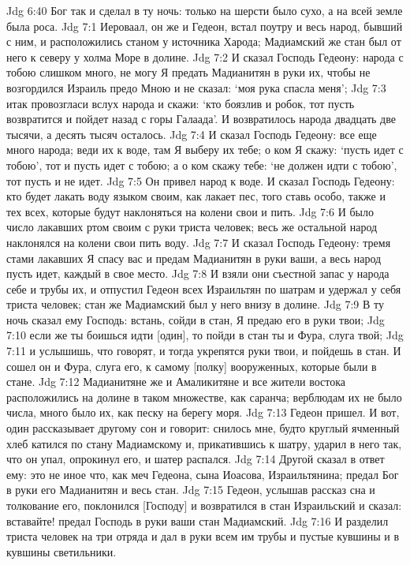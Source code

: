 Jdg 6:40  Бог так и сделал в ту ночь: только на шерсти было сухо, а на всей земле была роса.
Jdg 7:1  Иероваал, он же и Гедеон, встал поутру и весь народ, бывший с ним, и расположились станом у источника Харода; Мадиамский же стан был от него к северу у холма Море в долине.
Jdg 7:2  И сказал Господь Гедеону: народа с тобою слишком много, не могу Я предать Мадианитян в руки их, чтобы не возгордился Израиль предо Мною и не сказал: `моя рука спасла меня';
Jdg 7:3  итак провозгласи вслух народа и скажи: `кто боязлив и робок, тот пусть возвратится и пойдет назад с горы Галаада'. И возвратилось народа двадцать две тысячи, а десять тысяч осталось.
Jdg 7:4  И сказал Господь Гедеону: все еще много народа; веди их к воде, там Я выберу их тебе; о ком Я скажу: `пусть идет с тобою', тот и пусть идет с тобою; а о ком скажу тебе: `не должен идти с тобою', тот пусть и не идет.
Jdg 7:5  Он привел народ к воде. И сказал Господь Гедеону: кто будет лакать воду языком своим, как лакает пес, того ставь особо, также и тех всех, которые будут наклоняться на колени свои и пить.
Jdg 7:6  И было число лакавших ртом своим с руки триста человек; весь же остальной народ наклонялся на колени свои пить воду.
Jdg 7:7  И сказал Господь Гедеону: тремя стами лакавших Я спасу вас и предам Мадианитян в руки ваши, а весь народ пусть идет, каждый в свое место.
Jdg 7:8  И взяли они съестной запас у народа себе и трубы их, и отпустил Гедеон всех Израильтян по шатрам и удержал у себя триста человек; стан же Мадиамский был у него внизу в долине.
Jdg 7:9  В ту ночь сказал ему Господь: встань, сойди в стан, Я предаю его в руки твои;
Jdg 7:10  если же ты боишься идти [один], то пойди в стан ты и Фура, слуга твой;
Jdg 7:11  и услышишь, что говорят, и тогда укрепятся руки твои, и пойдешь в стан. И сошел он и Фура, слуга его, к самому [полку] вооруженных, которые были в стане.
Jdg 7:12  Мадианитяне же и Амаликитяне и все жители востока расположились на долине в таком множестве, как саранча; верблюдам их не было числа, много было их, как песку на берегу моря.
Jdg 7:13  Гедеон пришел. И вот, один рассказывает другому сон и говорит: снилось мне, будто круглый ячменный хлеб катился по стану Мадиамскому и, прикатившись к шатру, ударил в него так, что он упал, опрокинул его, и шатер распался.
Jdg 7:14  Другой сказал в ответ ему: это не иное что, как меч Гедеона, сына Иоасова, Израильтянина; предал Бог в руки его Мадианитян и весь стан.
Jdg 7:15  Гедеон, услышав рассказ сна и толкование его, поклонился [Господу] и возвратился в стан Израильский и сказал: вставайте! предал Господь в руки ваши стан Мадиамский.
Jdg 7:16  И разделил триста человек на три отряда и дал в руки всем им трубы и пустые кувшины и в кувшины светильники.

